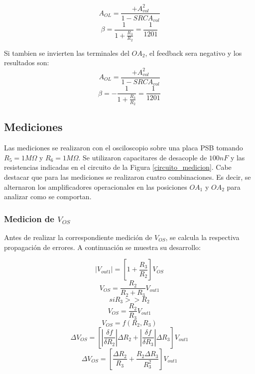 \begin{displaymath}  A_{OL}= \frac{+A_{vol}^2}{1-SRC A_{vol}}  \end{displaymath}
\begin{displaymath}  \beta =  \frac{1}{1+ \frac{R_3}{R_2}} = \frac{1}{1201}  \end{displaymath}

Si tambien se invierten las terminales del $OA_2$, el feedback sera negativo y los resultados son:
\begin{displaymath}  A_{OL}= \frac{+A_{vol}^2}{1-SRC A_{vol}}  \end{displaymath}
\begin{displaymath}  \beta =  -\frac{1}{1+ \frac{R_3}{R_2}} = \frac{1}{1201}  \end{displaymath}

\subsection{Mediciones}
Las mediciones se realizaron con el osciloscopio sobre una placa PSB tomando $R_5 = 1M\Omega$ y $R_6 = 1M\Omega$. Se utilizaron capacitares de desacople de $100nF$ y las resistencias indicadas en el circuito de la Figura \ref{circuito_medicion}.
Cabe destacar que para las mediciones se realizaron cuatro combinaciones. Es decir, se alternaron los amplificadores operacionales en las posiciones $OA_1$ y $OA_2$ para analizar como se comportan. 


\subsubsection{Medicion de $V_{OS}$}

Antes de realizar la correspondiente medición de $V_{OS}$, se calcula la respectiva propagación de errores.  A continuación se muestra su desarrollo:

\begin{displaymath} |V_{out1}| = [1 + \frac{R_3}{R_2}]V_{OS} \end{displaymath}
\begin{displaymath} V_{OS} = \frac{R_2}{R_2 + R_3} V_{out1} \end{displaymath}
\begin{displaymath} si R_3 >> R_2 \end{displaymath}  
\begin{displaymath} V_{OS} = \frac{R_2}{R_3} V_{out1} \end{displaymath} 
\begin{displaymath} V_{OS} = f(R_2,R_3) \end{displaymath} 
\begin{displaymath} \Delta V_{OS} = [|\frac{\delta f}{\delta R_2}| \Delta R_2 + |\frac{\delta f}{\delta R_3}| \Delta R_3 ] V_{out1} \end{displaymath} 
\begin{displaymath} \Delta V_{OS} = [\frac {\Delta R_2} { R_3} + \frac{R_2 \Delta R_3 }{R_3^2}] V_{out1} \end{displaymath} 

